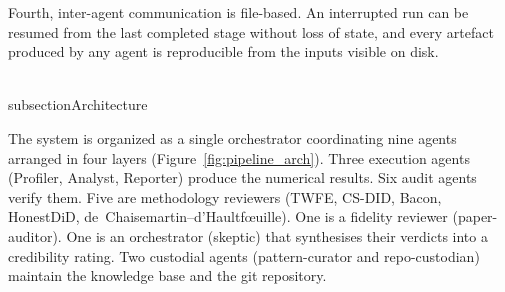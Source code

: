 Fourth, inter-agent communication is file-based. An interrupted run can be resumed from the last completed stage without loss of state, and every artefact produced by any agent is reproducible from the inputs visible on disk.


\\subsection{Architecture}
\label{sec:appc_architecture}

The system is organized as a single orchestrator coordinating nine agents arranged in four layers (Figure~\ref{fig:pipeline_arch}). Three execution agents (Profiler, Analyst, Reporter) produce the numerical results. Six audit agents verify them. Five are methodology reviewers (TWFE, CS-DID, Bacon, HonestDiD, de~Chaisemartin--d'Haultf\oe{}uille). One is a fidelity reviewer (paper-auditor). One is an orchestrator (skeptic) that synthesises their verdicts into a credibility rating. Two custodial agents (pattern-curator and repo-custodian) maintain the knowledge base and the git repository.

